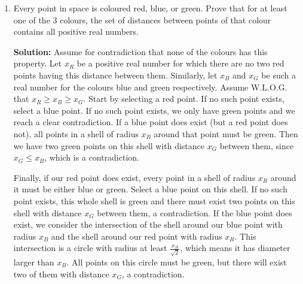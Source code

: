 \documentclass{article}
\begin{document}
\begin{enumerate}[itemsep=24pt]
\item %
Every point in space is coloured red, blue, or green. Prove that for at least one of the 3 colours, the set of distances between points of that colour contains all positive real numbers.

\textbf{Solution:}
Assume for contradiction that none of the colours has this property.
Let $x_R$ be a positive real number for which there are no two red points having this distance between them.
Similarly, let $x_B$ and $x_G$ be such a real number for the colours blue and green respectively.
Assume W.L.O.G. that $x_R\geq x_B \geq x_G$.
Start by selecting a red point.
If no such point exists, select a blue point.
If no such point exists, we only have green points and we reach a clear contradiction.
If a blue point does exist (but a red point does not), all points in a shell of radius $x_B$ around that point must be green.
Then we have two green points on this shell with distance $x_G$ between them, since $x_G\leq x_B$, which is a contradiction.

Finally, if our red point does exist, every point in a shell of radius $x_R$ around it must be either blue or green.
Select a blue point on this shell.
If no such point exists, this whole shell is green and there must exist two points on this shell with distance $x_G$ between them, a contradiction.
If the blue point does exist, we consider the intersection of the shell around our blue point with radius $x_B$ and the shell around our red point with radius $x_R$.
This intersection is a circle with radius at least $\frac{x_B}{\sqrt{2}}$, which means it has diameter larger than $x_B$.
All points on this circle must be green, but there will exist two of them with distance $x_G$, a contradiction.

\end{enumerate}
\end{document}
